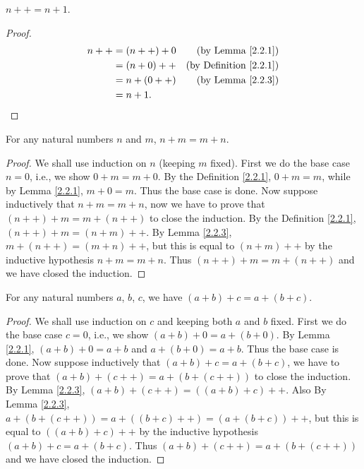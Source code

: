\begin{additional corollary}\label{ac 2.2.2}
\(n++ = n + 1\).
\end{additional corollary}

\begin{proof}
\begin{align*}
n++ &= (n++) + 0 & \text{(by Lemma \ref{2.2.1})} \\
&= (n + 0)++ & \text{(by Definition \ref{2.2.1})} \\
&= n + (0++) & \text{(by Lemma \ref{2.2.3})} \\
&= n + 1.
\end{align*}
\end{proof}

\begin{proposition}\label{2.2.4}
For any natural numbers \(n\) and \(m\), \(n + m = m + n\).
\end{proposition}

\begin{proof}
We shall use induction on \(n\) (keeping \(m\) fixed).
First we do the base case \(n = 0\), i.e., we show \(0 + m = m + 0\).
By the Definition \ref{2.2.1}, \(0 + m = m\), while by Lemma \ref{2.2.1}, \(m + 0 = m\).
Thus the base case is done.
Now suppose inductively that \(n + m = m + n\), now we have to prove that \((n++) + m = m + (n++)\) to close the induction.
By the Definition \ref{2.2.1}, \((n++) + m = (n + m)++\).
By Lemma \ref{2.2.3}, \(m + (n++) = (m + n)++\), but this is equal to \((n + m)++\) by the inductive hypothesis \(n+m=m+n\).
Thus \((n++) + m = m + (n++)\) and we have closed the induction.
\end{proof}

\begin{proposition}\label{2.2.5}
For any natural numbers \(a\), \(b\), \(c\), we have \((a + b) + c = a + (b + c)\).
\end{proposition}

\begin{proof}
We shall use induction on \(c\) and keeping both \(a\) and \(b\) fixed.
First we do the base case \(c = 0\), i.e., we show \((a + b) + 0 = a + (b + 0)\).
By Lemma \ref{2.2.1}, \((a + b) + 0 = a + b\) and \(a + (b + 0) = a + b\).
Thus the base case is done.
Now suppose inductively that \((a + b) + c = a + (b + c)\), we have to prove that \((a + b) + (c++) = a + (b + (c++))\) to close the induction.
By Lemma \ref{2.2.3}, \((a + b) + (c++) = ((a + b) + c)++\).
Also By Lemma \ref{2.2.3}, \(a + (b + (c++)) = a + ((b + c)++) = (a + (b + c))++\), but this is equal to \(((a + b) + c)++\) by the inductive hypothesis \((a + b) + c = a + (b + c)\).
Thus \((a + b) + (c++) = a + (b + (c++))\) and we have closed the induction.
\end{proof}

